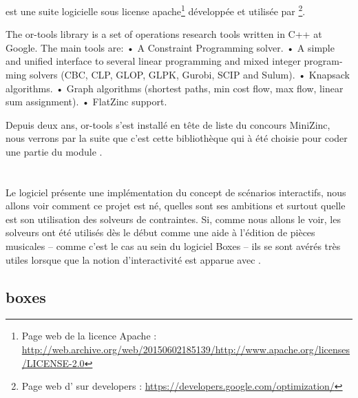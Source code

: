 \subsubsection{\ortools{}}

\ortools{} est une suite logicielle sous license apache\footnote{Page web de la licence Apache : \url{http://web.archive.org/web/20150602185139/http://www.apache.org/licenses/LICENSE-2.0} \archive{}} développée et utilisée par \google{}\footnote{Page web d'\ortools{} sur \google{} developers : \url{https://developers.google.com/optimization/} }.
%
\begin{citeauteur}
The or-tools library is a set of operations research tools written in C++ at Google. The main tools are:
• A Constraint Programming solver.
• A simple and unified interface to several linear programming and mixed integer program-
ming solvers (CBC, CLP, GLOP, GLPK, Gurobi, SCIP and Sulum).
• Knapsack algorithms.
• Graph algorithms (shortest paths, min cost flow, max flow, linear sum assignment).
• FlatZinc support.
\end{citeauteur}

Depuis deux ans, or-tools s'est installé en tête de liste du concours MiniZinc\cite{Minizinc2015}, nous verrons par la suite que c'est cette bibliothèque qui à été choisie pour coder une partie du module \csp{}.










\section{\iscore{}}

Le logiciel \iscore{} présente une implémentation du concept de scénarios interactifs, nous allons voir comment ce projet est né, quelles sont ses ambitions et surtout quelle est son utilisation des solveurs de contraintes. Si, comme nous allons le voir, les solveurs ont été utilisés dès le début comme une aide à l'édition de pièces musicales -- comme c'est le cas au sein du logiciel Boxes -- ils se sont avérés très utiles lorsque que la notion d'interactivité est apparue avec \iscore{}.

\subsection{boxes}%

